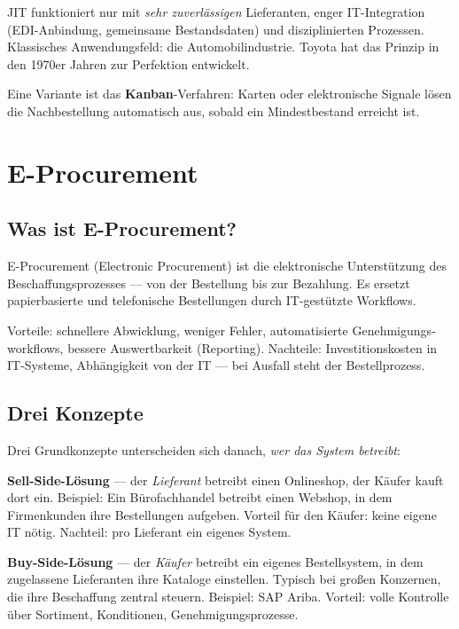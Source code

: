 \documentclass[11pt, a4paper]{article}
\begin{document}
JIT funktioniert nur mit \emph{sehr zuverlässigen} Lieferanten, enger IT-Integration
(EDI-Anbindung, gemeinsame Bestandsdaten) und disziplinierten Prozessen. Klassisches
Anwendungsfeld: die Automobil­industrie. Toyota hat das Prinzip in den 1970er Jahren
zur Perfektion entwickelt.

Eine Variante ist das \textbf{Kanban}-Verfahren: Karten oder elektronische Signale
lösen die Nachbestellung automatisch aus, sobald ein Mindestbestand erreicht ist.

\section{E-Procurement}

\subsection{Was ist E-Procurement?}

\begin{merksatz}
E-Procurement (Electronic Procurement) ist die elektronische Unterstützung des
Beschaffungs­prozesses --- von der Bestellung bis zur Bezahlung. Es ersetzt papierbasierte
und telefonische Bestellungen durch IT-gestützte Workflows.
\end{merksatz}

Vorteile: schnellere Abwicklung, weniger Fehler, automatisierte Genehmigungs­
workflows, bessere Auswertbarkeit (Reporting). Nachteile: Investitions­kosten in
IT-Systeme, Abhängigkeit von der IT --- bei Ausfall steht der Bestellprozess.

\subsection{Drei Konzepte}

Drei Grundkonzepte unterscheiden sich danach, \emph{wer das System betreibt}:

\textbf{Sell-Side-Lösung} --- der \emph{Lieferant} betreibt einen Onlineshop, der
Käufer kauft dort ein. Beispiel: Ein Bürofachhandel betreibt einen Webshop, in dem
Firmenkunden ihre Bestellungen aufgeben. Vorteil für den Käufer: keine eigene IT
nötig. Nachteil: pro Lieferant ein eigenes System.

\textbf{Buy-Side-Lösung} --- der \emph{Käufer} betreibt ein eigenes Bestellsystem,
in dem zugelassene Lieferanten ihre Kataloge einstellen. Typisch bei großen Konzernen,
die ihre Beschaffung zentral steuern. Beispiel: SAP Ariba. Vorteil: volle Kontrolle
über Sortiment, Konditionen, Genehmigungs­prozesse.
\end{document}
